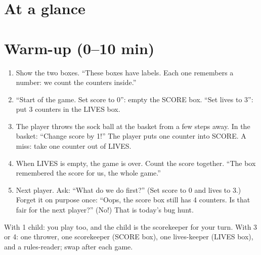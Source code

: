 \section{At a glance}
\begin{timeplan}
\end{timeplan}

\section{Warm-up (0--10 min)}
\begin{unplugged}
\begin{enumerate}[leftmargin=1.4em,itemsep=1pt]
  \item Show the two boxes. \enquote{These boxes have labels. Each one remembers a number: we count the counters inside.}
  \item \enquote{Start of the game. Set score to 0}: empty the SCORE box. \enquote{Set lives to 3}: put 3 counters in the LIVES box.
  \item The player throws the sock ball at the basket from a few steps away. In the basket: \enquote{Change score by 1!} The player puts one counter into SCORE. A miss: take one counter out of LIVES.
  \item When LIVES is empty, the game is over. Count the score together. \enquote{The box remembered the score for us, the whole game.}
  \item Next player. Ask: \enquote{What do we do first?} (Set score to 0 and lives to 3.) Forget it on purpose once: \enquote{Oops, the score box still has 4 counters. Is that fair for the next player?} (No!) That is today's bug hunt.
\end{enumerate}
With 1 child: you play too, and the child is the scorekeeper for your turn. With 3 or 4: one thrower, one scorekeeper (SCORE box), one lives-keeper (LIVES box), and a rules-reader; swap after each game.
\end{unplugged}

